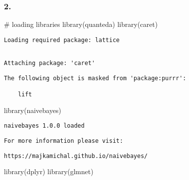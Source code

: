 \documentclass[
  12pt,
  letterpaper,
  DIV=11,
  numbers=noendperiod]{scrartcl}
\newenvironment{Shaded}{\begin{snugshade}}{\end{snugshade}}
\newcommand{\CommentTok}[1]{\textcolor[rgb]{0.37,0.37,0.37}{#1}}
\newcommand{\FunctionTok}[1]{\textcolor[rgb]{0.28,0.35,0.67}{#1}}
\newcommand{\NormalTok}[1]{\textcolor[rgb]{0.00,0.23,0.31}{#1}}
\begin{document}
\newpage

\subsubsection{\texorpdfstring{\textbf{2.}}{2.}}\label{section-1}

\begin{Shaded}
\begin{Highlighting}[]
\CommentTok{\# loading libraries}
\FunctionTok{library}\NormalTok{(quanteda)}
\FunctionTok{library}\NormalTok{(caret)}
\end{Highlighting}
\end{Shaded}

\begin{verbatim}
Loading required package: lattice
\end{verbatim}

\begin{verbatim}

Attaching package: 'caret'
\end{verbatim}

\begin{verbatim}
The following object is masked from 'package:purrr':

    lift
\end{verbatim}

\begin{Shaded}
\begin{Highlighting}[]
\FunctionTok{library}\NormalTok{(naivebayes)}
\end{Highlighting}
\end{Shaded}

\begin{verbatim}
naivebayes 1.0.0 loaded
\end{verbatim}

\begin{verbatim}
For more information please visit: 
\end{verbatim}

\begin{verbatim}
https://majkamichal.github.io/naivebayes/
\end{verbatim}

\begin{Shaded}
\begin{Highlighting}[]
\FunctionTok{library}\NormalTok{(dplyr)}
\FunctionTok{library}\NormalTok{(glmnet)}
\end{Highlighting}
\end{Shaded}
\end{document}
